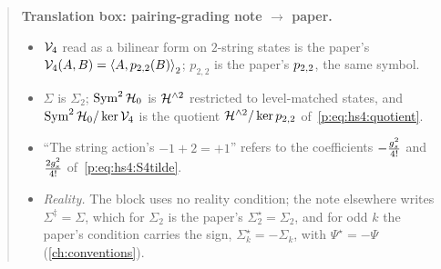 \begin{quote}
  \small
  \textbf{Translation box: pairing-grading note $\to$ paper.}
  \begin{itemize}
    \setlength{\itemsep}{0.3ex}
    \item $\mc V_4$ read as a bilinear form on $2$-string states is the paper's $\vertex{4}(A, B) = \pair[2]{A}{\sprod{2}{2}(B)}$; $p_{2,2}$ is the paper's $\sprod{2}{2}$, the same symbol.
    \item $\Sigma$ is $\Sigma_2$; $\Sym^2 \mc H_0$ is $\Hn{2}$ restricted to level-matched states, and $\Sym^2 \mc H_0 / \ker \mc V_4$ is the quotient $\Hn{2} / \ker \sprod{2}{2}$ of~\eqref{p:eq:hs4:quotient}.
    \item \enquote{The string action's $- 1 + 2 = + 1$} refers to the coefficients $- \frac{\gs^2}{4!}$ and $\frac{2 \gs^2}{4!}$ of~\eqref{p:eq:hs4:S4tilde}.
    \item \emph{Reality.} The block uses no reality condition; the note elsewhere writes $\Sigma^\ddagger = \Sigma$, which for $\Sigma_2$ is the paper's $\Sigma_2^\star = \Sigma_2$, and for odd $k$ the paper's condition carries the sign, $\Sigma_k^\star = - \Sigma_k$, with $\Psi^\star = - \Psi$ (\cref{ch:conventions}).
  \end{itemize}
\end{quote}


